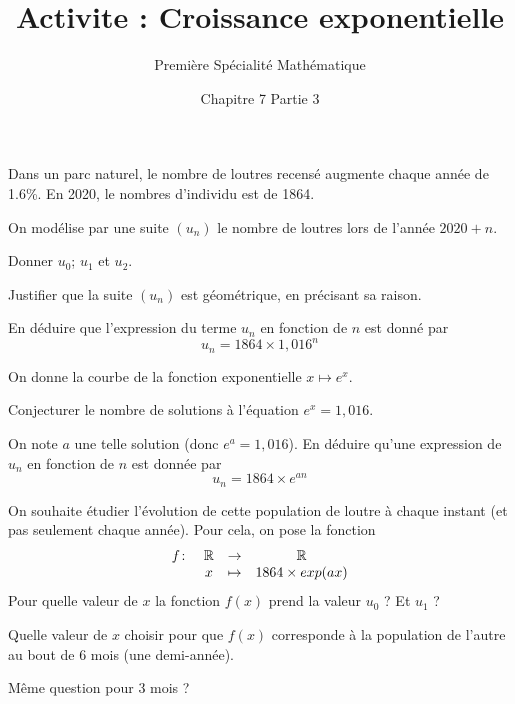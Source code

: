 \documentclass{exos}
\title{Activite : Croissance exponentielle}
\author{Première Spécialité Mathématique}
\date{Chapitre 7 Partie 3}
\begin{document}
\maketitle

Dans un parc naturel, le nombre de loutres recensé augmente chaque année de \num{1.6}\%. En 2020, le nombres d'individu est de \num{1864}.

On modélise par une suite $(u_n)$ le nombre de loutres lors de l'année $2020 + n$.

\begin{alphaquestions}
\item Donner $u_0$; $u_1$ et $u_2$.
\item Justifier que la suite $(u_n)$ est géométrique, en précisant sa raison.
\item En déduire que l'expression du terme $u_n$ en fonction de $n$ est donné par
\begin{equation*}
u_n = 1864 \times 1,016^n
\end{equation*}
\item On donne la courbe de la fonction exponentielle $x \mapsto e^x$.
\begin{center}
\end{center}
Conjecturer le nombre de solutions à l'équation $e^x = 1,016$.
\item On note $a$ une telle solution (donc $e^a = 1,016$). En déduire qu'une expression de $u_n$ en fonction de $n$ est donnée par
\begin{equation*}
u_n = 1864 \times e^{an}
\end{equation*}
\item On souhaite étudier l'évolution de cette population de loutre à chaque instant (et pas seulement chaque année). Pour cela, on pose la fonction
\begin{equation*}
\begin{array}[t]{lccc} f \colon &\mathbb{R} &\to& \mathbb{R}\\ & x &\mapsto& 1864 \times exp(ax)\end{array}
\end{equation*}
Pour quelle valeur de $x$ la fonction $f(x)$ prend la valeur $u_0$ ? Et $u_1$ ?
\item Quelle valeur de $x$ choisir pour que $f(x)$ corresponde à la population de l'autre au bout de \num{6} mois (une demi-année).
\item Même question pour \num{3} mois ?
\end{alphaquestions}
\end{document}
